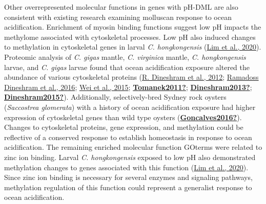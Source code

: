\documentclass [11pt, proquest] {uwthesis}[2015/03/03]
\begin{document}
Other overrepresented molecular functions in genes with pH-DML are also consistent with existing research examining molluscan response to ocean acidification. Enrichment of myosin binding functions suggest low pH impacts the methylome associated with cytoskeletal processes. Low pH also induced changes to methylation in cytoskeletal genes in larval \emph{C. hongkongensis} (\protect\hyperlink{ref-Lim2020}{Lim et al., 2020}). Proteomic analysis of \emph{C. gigas} mantle, \emph{C. virginica} mantle, \emph{C. hongkongensis} larvae, and \emph{C. gigas} larvae found that ocean acidification exposure altered the abundance of various cytoskeletal proteins (\protect\hyperlink{ref-Dineshram2012}{R. Dineshram et al., 2012}; \protect\hyperlink{ref-Dineshram2016}{Ramadoss Dineshram et al., 2016}; \protect\hyperlink{ref-Wei2015}{Wei et al., 2015}; \protect\hyperlink{ref-Tomanek2011}{\textbf{Tomanek2011?}}; \protect\hyperlink{ref-Dineshram2013}{\textbf{Dineshram2013?}}; \protect\hyperlink{ref-Dineshram2015}{\textbf{Dineshram2015?}}). Additionally, selectively-bred Sydney rock oysters (\emph{Saccostrea glomerata}) with a history of ocean acidification exposure had higher expression of cytoskeletal genes than wild type oysters (\protect\hyperlink{ref-Goncalves2016}{\textbf{Goncalves2016?}}). Changes to cytoskeletal proteins, gene expression, and methylation could be reflective of a conserved response to establish homeostasis in response to ocean acidification. The remaining enriched molecular function GOterms were related to zinc ion binding. Larval \emph{C. hongkongensis} exposed to low pH also demonstrated methylation changes to genes associated with this function (\protect\hyperlink{ref-Lim2020}{Lim et al., 2020}). Since zinc ion binding is necessary for several enzymes and signaling pathways, methylation regulation of this function could represent a generalist response to ocean acidification.
\end{document}
